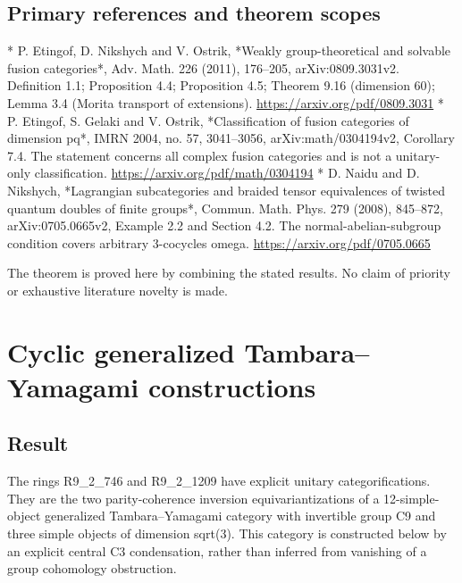 \hypertarget{primary-references-and-theorem-scopes}{%
\subsection{Primary references and theorem
scopes}\label{primary-references-and-theorem-scopes}}

* P. Etingof, D. Nikshych and V. Ostrik, *Weakly group-theoretical and
solvable fusion categories*, Adv. Math. 226 (2011), 176--205,
arXiv:0809.3031v2. Definition 1.1; Proposition 4.4; Proposition 4.5;
Theorem 9.16 (dimension 60); Lemma 3.4 (Morita transport of extensions).
\url{https://arxiv.org/pdf/0809.3031} * P. Etingof, S. Gelaki and V.
Ostrik, *Classification of fusion categories of dimension pq*, IMRN
2004, no. 57, 3041--3056, arXiv:math/0304194v2, Corollary 7.4. The
statement concerns all complex fusion categories and is not a
unitary-only classification. \url{https://arxiv.org/pdf/math/0304194} *
D. Naidu and D. Nikshych, *Lagrangian subcategories and braided tensor
equivalences of twisted quantum doubles of finite groups*, Commun. Math.
Phys. 279 (2008), 845--872, arXiv:0705.0665v2, Example 2.2 and Section
4.2. The normal-abelian-subgroup condition covers arbitrary 3-cocycles
omega. \url{https://arxiv.org/pdf/0705.0665}

The theorem is proved here by combining the stated results. No claim of
priority or exhaustive literature novelty is made.

\hypertarget{cyclic-generalized-tambarayamagami-constructions}{%
\section{Cyclic generalized Tambara--Yamagami
constructions}\label{cyclic-generalized-tambarayamagami-constructions}}

\hypertarget{result}{%
\subsection{Result}\label{result}}

The rings R9\_2\_746 and R9\_2\_1209 have explicit unitary
categorifications. They are the two parity-coherence inversion
equivariantizations of a 12-simple-object generalized Tambara--Yamagami
category with invertible group C9 and three simple objects of dimension
sqrt(3). This category is constructed below by an explicit central C3
condensation, rather than inferred from vanishing of a group cohomology
obstruction.

